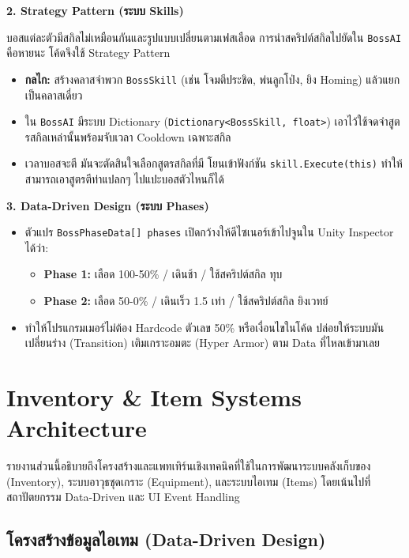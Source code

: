 \textbf{2. Strategy Pattern (ระบบ Skills)}

บอสแต่ละตัวมีสกิลไม่เหมือนกันและรูปแบบเปลี่ยนตามเฟสเลือด การนำสคริปต์สกิลไปยัดใน \texttt{BossAI} คือหายนะ โค้ดจึงใช้ Strategy Pattern

\begin{itemize}
\item \textbf{กลไก:} สร้างคลาสจำพวก \texttt{BossSkill} (เช่น โจมตีประชิด, พ่นลูกโป่ง, ยิง Homing) แล้วแยกเป็นคลาสเดี่ยว
\item ใน \texttt{BossAI} มีระบบ Dictionary (\texttt{Dictionary<BossSkill, float>}) เอาไว้ใช้จดจำสูตรสกิลเหล่านั้นพร้อมจับเวลา Cooldown เฉพาะสกิล
\item เวลาบอสจะตี มันจะตัดสินใจเลือกสูตรสกิลที่มี โยนเข้าฟังก์ชัน \texttt{skill.Execute(this)} ทำให้สามารถเอาสูตรตีท่าแปลกๆ ไปแปะบอสตัวไหนก็ได้
\end{itemize}

\textbf{3. Data-Driven Design (ระบบ Phases)}

\begin{itemize}
\item ตัวแปร \texttt{BossPhaseData[] phases} เปิดกว้างให้ดีไซเนอร์เข้าไปจูนใน Unity Inspector ได้ว่า:
    \begin{itemize}
    \item \textbf{Phase 1:} เลือด 100-50\% / เดินช้า / ใช้สคริปต์สกิล ทุบ
    \item \textbf{Phase 2:} เลือด 50-0\% / เดินเร็ว 1.5 เท่า / ใช้สคริปต์สกิล ยิงเวทย์
    \end{itemize}
\item ทำให้โปรแกรมเมอร์ไม่ต้อง Hardcode ตัวเลข 50\% หรือเงื่อนไขในโค้ด ปล่อยให้ระบบมันเปลี่ยนร่าง (Transition) เติมเกราะอมตะ (Hyper Armor) ตาม Data ที่ไหลเข้ามาเลย
\end{itemize}

\section{Inventory \& Item Systems Architecture}

รายงานส่วนนี้อธิบายถึงโครงสร้างและแพทเทิร์นเชิงเทคนิคที่ใช้ในการพัฒนาระบบคลังเก็บของ (Inventory), ระบบอาวุธชุดเกราะ (Equipment), และระบบไอเทม (Items) โดยเน้นไปที่สถาปัตยกรรม Data-Driven และ UI Event Handling

\subsection{โครงสร้างข้อมูลไอเทม (Data-Driven Design)}

